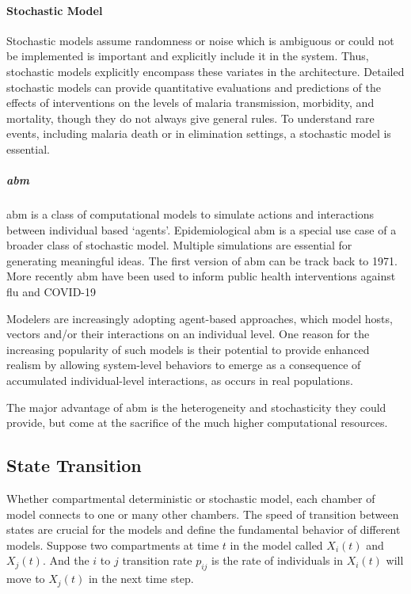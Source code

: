 \documentclass[a4paper, 12pt, twoside]{article}
\begin{document}
\paragraph{Stochastic Model}
\label{par:stochastic_model}
Stochastic models assume randomness or noise which is ambiguous or could not be implemented is important and explicitly include it in the system.
Thus, stochastic models explicitly encompass these variates in the architecture.
Detailed stochastic models can provide quantitative evaluations and predictions of the effects of interventions on the levels of malaria transmission, morbidity, and mortality, though they do not always give general rules.
To understand rare events, including malaria death or in elimination settings, a stochastic model is essential.

\subparagraph{\gls{abm}}
\gls{abm} is a class of computational models to simulate actions and interactions between individual based `agents'.
Epidemiological \gls{abm} is a special use case of a broader class of stochastic model.
Multiple simulations are essential for generating meaningful ideas.
The first version of \gls{abm} can be track back to 1971\cite{Schelling1971}.
More recently \gls{abm} have been used to inform public health interventions against flu\cite{Ferguson2006a, Ferguson2005} and COVID-19\cite{Maziarz2020, Ferguson2020, Chang2020}

Modelers are increasingly adopting agent-based approaches, which model hosts, vectors and/or their interactions on an individual level.
One reason for the increasing popularity of such models is their potential to provide enhanced realism by allowing system-level behaviors to emerge as a consequence of accumulated individual-level interactions, as occurs in real populations.

The major advantage of \gls{abm} is the heterogeneity and stochasticity they could provide, but come at the sacrifice of the much higher computational resources.

\subsection{State Transition}
Whether compartmental deterministic or stochastic model, each chamber of model connects to one or many other chambers.
The speed of transition between states are crucial for the models and define the fundamental behavior of different models.
Suppose two compartments at time $t$ in the model called $X_i(t)$ and $X_j(t)$. And the  $i$ to  $j$ transition rate  $p_{ij}$ is the rate of individuals in $X_i(t)$ will move to $X_j(t)$ in the next time step.
\end{document}
